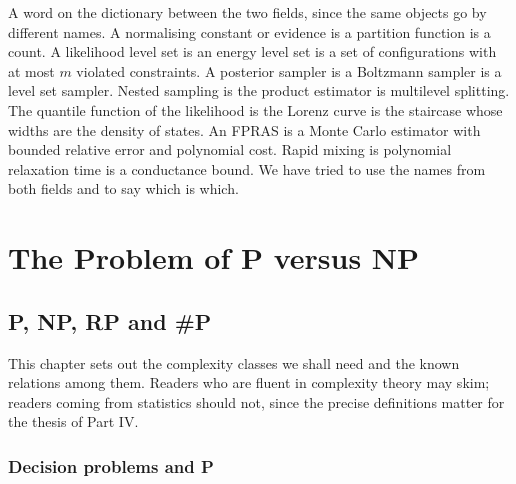 \documentclass[11pt,twoside,openany]{book}
\theoremstyle{plain}
\theoremstyle{definition}
\theoremstyle{remark}
\begin{document}
A word on the dictionary between the two fields, since the same objects go by different names. A normalising constant or evidence is a partition function is a count. A likelihood level set is an energy level set is a set of configurations with at most $m$ violated constraints. A posterior sampler is a Boltzmann sampler is a level set sampler. Nested sampling is the product estimator is multilevel splitting. The quantile function of the likelihood is the Lorenz curve is the staircase whose widths are the density of states. An FPRAS is a Monte Carlo estimator with bounded relative error and polynomial cost. Rapid mixing is polynomial relaxation time is a conductance bound. We have tried to use the names from both fields and to say which is which.

\mainmatter

\part{The Problem of P versus NP}





























\chapter{P, NP, RP and \#P}
\label{ch:classes}

This chapter sets out the complexity classes we shall need and the known relations among them. Readers who are fluent in complexity theory may skim; readers coming from statistics should not, since the precise definitions matter for the thesis of Part IV.

\section{Decision problems and P}
\end{document}
